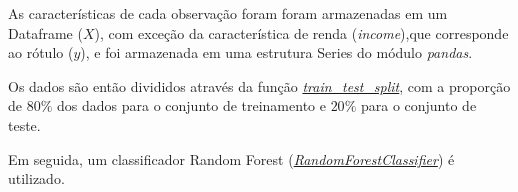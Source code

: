 As características de cada observação foram foram armazenadas em um Dataframe ($X$), com exceção da característica de renda (\textit{income}),que corresponde ao rótulo ($y$), e foi armazenada em uma estrutura Series do módulo \textit{pandas}.

Os dados são então divididos através da função \href{https://scikit-learn.org/stable/modules/generated/sklearn.model_selection.train_test_split.html}{\textit{train\_test\_split}}, com a proporção de $80\%$ dos dados para o conjunto de treinamento e $20\%$ para o conjunto de teste. 

Em seguida, um classificador Random Forest (\href{https://scikit-learn.org/stable/modules/generated/sklearn.ensemble.RandomForestClassifier.html}{\textit{RandomForestClassifier}}) é utilizado.




